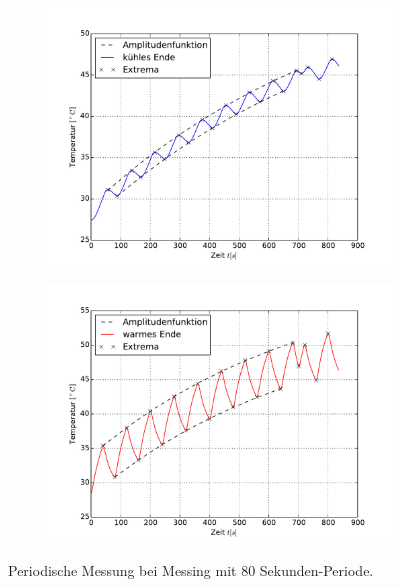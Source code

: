 \begin{figure}[h!]
	\centering
	\begin{subfigure}{0.9\textwidth}
	\includegraphics[width=\textwidth]{Bilder/M2_Messing_kuehl.pdf}
	\end{subfigure}
	\begin{subfigure}{0.9\textwidth}
	\includegraphics[width=\textwidth]{Bilder/M2_Messing_warm.pdf}
	\end{subfigure}
	\caption{Periodische Messung bei Messing mit 80 Sekunden-Periode.}
	\label{fig:M2Messing}
\end{figure}
